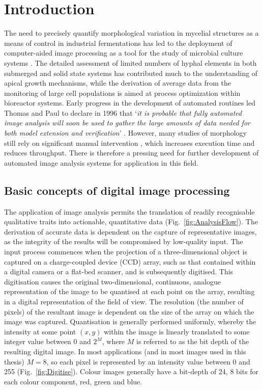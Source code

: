 \section{Introduction}

The need to precisely quantify morphological variation in mycelial structures as a means of control in industrial fermentations has led to the deployment of computer-aided image processing as a tool for the study of microbial culture systems \cite{cox1998}. The detailed assessment of limited numbers of hyphal elements in both submerged \cite{spohr1998} and solid state systems \cite{bartnicki-garcia2000,dieguez-uribeondo2004} has contributed much to the understanding of apical growth mechanisms, while the derivation of average data from the monitoring of large cell populations \cite{carlsen1996a,spohr1997} is aimed at process optimization within bioreactor systems. Early progress in the development of automated routines \cite{tucker1992} led Thomas and Paul to declare in 1996 that \lq \emph{it is probable that fully automated image analysis will soon be used to gather the large amounts of data needed for both model extension and verification}' \cite{thomas1996}. However, many studies of morphology still rely on significant manual intervention \cite{mcintyre1997,wongwicharn1999,lubbehusen2003,rahardjo2005b,lecault2007}, which increases execution time and reduces throughput. There is therefore a pressing need for further development of automated image analysis systems for application in this field.

\subsection{Basic concepts of digital image processing}

The application of image analysis permits the translation of readily recognisable qualitative traits into actionable, quantitative data (Fig.~\ref{fig:AnalysisFlow}). The derivation of accurate data is dependent on the capture of representative images, as the integrity of the results will be compromised by low-quality input. The input process commences when the projection of a three-dimensional object is captured on a charge-coupled device (CCD) array, such as that contained within a digital camera or a flat-bed scanner, and is subsequently digitised. This digitisation causes the original two-dimensional, continuous, analogue representation of the image to be quantised at each point on the array, resulting in a digital representation of the field of view. The resolution (the number of pixels) of the resultant image is dependent on the size of the array on which the image was captured. Quantisation is generally performed uniformly, whereby the intensity at some point $(x,y)$ within the image is linearly translated to some integer value between $0$ and $2^M$, where $M$ is referred to as the bit depth of the resulting digital image. In most applications (and in most images used in this thesis) $M=8$, so each pixel is represented by an intensity value between 0 and 255 (Fig.~\ref{fig:Digitise}). Colour images generally have a bit-depth of 24, 8 bits for each colour component, red, green and blue.

